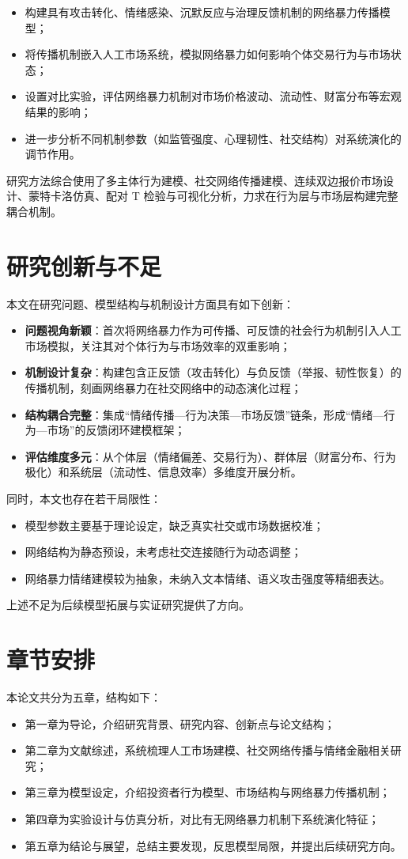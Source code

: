 \begin{itemize}
  \item 构建具有攻击转化、情绪感染、沉默反应与治理反馈机制的网络暴力传播模型；
  \item 将传播机制嵌入人工市场系统，模拟网络暴力如何影响个体交易行为与市场状态；
  \item 设置对比实验，评估网络暴力机制对市场价格波动、流动性、财富分布等宏观结果的影响；
  \item 进一步分析不同机制参数（如监管强度、心理韧性、社交结构）对系统演化的调节作用。
\end{itemize}

研究方法综合使用了多主体行为建模、社交网络传播建模、连续双边报价市场设计、蒙特卡洛仿真、配对 T 检验与可视化分析，力求在行为层与市场层构建完整耦合机制。

\section{研究创新与不足}

本文在研究问题、模型结构与机制设计方面具有如下创新：

\begin{itemize}
  \item \textbf{问题视角新颖}：首次将网络暴力作为可传播、可反馈的社会行为机制引入人工市场模拟，关注其对个体行为与市场效率的双重影响；
  \item \textbf{机制设计复杂}：构建包含正反馈（攻击转化）与负反馈（举报、韧性恢复）的传播机制，刻画网络暴力在社交网络中的动态演化过程；
  \item \textbf{结构耦合完整}：集成“情绪传播—行为决策—市场反馈”链条，形成“情绪—行为—市场”的反馈闭环建模框架；
  \item \textbf{评估维度多元}：从个体层（情绪偏差、交易行为）、群体层（财富分布、行为极化）和系统层（流动性、信息效率）多维度开展分析。
\end{itemize}

同时，本文也存在若干局限性：

\begin{itemize}
  \item 模型参数主要基于理论设定，缺乏真实社交或市场数据校准；
  \item 网络结构为静态预设，未考虑社交连接随行为动态调整；
  \item 网络暴力情绪建模较为抽象，未纳入文本情绪、语义攻击强度等精细表达。
\end{itemize}

上述不足为后续模型拓展与实证研究提供了方向。

\section{章节安排}

本论文共分为五章，结构如下：

\begin{itemize}
  \item 第一章为导论，介绍研究背景、研究内容、创新点与论文结构；
  \item 第二章为文献综述，系统梳理人工市场建模、社交网络传播与情绪金融相关研究；
  \item 第三章为模型设定，介绍投资者行为模型、市场结构与网络暴力传播机制；
  \item 第四章为实验设计与仿真分析，对比有无网络暴力机制下系统演化特征；
  \item 第五章为结论与展望，总结主要发现，反思模型局限，并提出后续研究方向。
\end{itemize}
